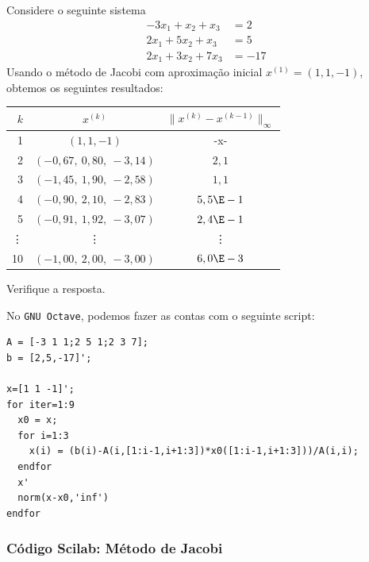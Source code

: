 \begin{ex}
  Considere o seguinte sistema
  \begin{equation}
    \begin{split}
      -3x_1 + x_2 + x_3 &= 2\\
      2x_1 + 5x_2 + x_3 &= 5\\
      2x_1 + 3x_2 + 7x_3 &= -17
    \end{split}
  \end{equation}
Usando o método de Jacobi com aproximação inicial $x^{(1)} = (1, 1, -1)$, obtemos os seguintes resultados:
\begin{center}
  \begin{tabular}{rcc}\hline
    $k$ & $x^{(k)}$ & $\|x^{(k)}-x^{(k-1)}\|_\infty$\\\hline
    1   & $(1, 1, -1)$ & -x-\\
    2   & $(-0,67,~0,80,~-3,14)$ & $2,1$\\
    3   & $(-1,45,~1,90,~-2,58)$ & $1,1$\\
    4   & $(-0,90,~2,10,~-2,83)$ & $5,5\E-1$\\
    5   & $(-0,91,~1,92,~-3,07)$ & $2,4\E-1$\\
    \vdots & \vdots & \vdots\\
    10  & $(-1,00,~2,00,~-3,00)$ & $6,0\E-3$\\\hline
  \end{tabular}
\end{center}
Verifique a resposta.

\ifisscilab
\construirScilab
\fi
\ifisoctave
No \verb+GNU Octave+, podemos fazer as contas com o seguinte script:
\begin{verbatim}
A = [-3 1 1;2 5 1;2 3 7];
b = [2,5,-17]';

x=[1 1 -1]';
for iter=1:9
  x0 = x;
  for i=1:3
    x(i) = (b(i)-A(i,[1:i-1,i+1:3])*x0([1:i-1,i+1:3]))/A(i,i);
  endfor
  x'
  norm(x-x0,'inf')
endfor
\end{verbatim}
\fi
\end{ex}

\ifisscilab
\subsubsection{Código Scilab: Método de Jacobi}


\fi
\ifisoctave
